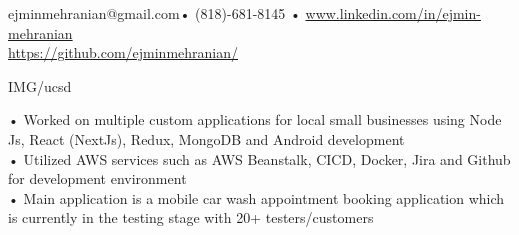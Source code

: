 \documentclass[paper=a4,fontsize=11pt]{temp} %
\begin{document}
\begin{minipage}{1.0\linewidth}
   
   
    ejminmehranian@gmail.com\hspace{0.5cm}• \hspace{0.5cm} (818)-681-8145 \hspace{0.5cm} • \hspace{0.5cm} \url {www.linkedin.com/in/ejmin-mehranian} \\  \hspace{0.6cm} \url{https://github.com/ejminmehranian/}
 
\end{minipage}

\noindent


{}{IMG/ucsd}

\noindent

{• Worked on multiple custom applications for local small businesses using Node Js, React (NextJs), Redux, MongoDB and Android development
\\ • Utilized AWS services such as AWS Beanstalk, CICD, Docker, Jira and Github for development environment
\\ • Main application is a mobile car wash appointment booking application which is currently in the testing stage with 20+ testers/customers
} {}

\sepspace
\end{document}
